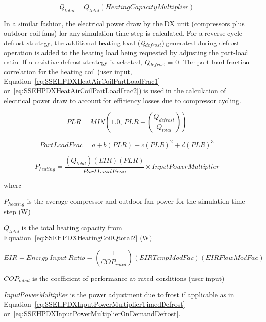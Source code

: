 \begin{equation}
Q_{total} = Q_{total}\left( {HeatingCapacityMultiplier} \right)
\label{eq:SSEHPDXHeatingCoilQtotal2}
\end{equation}

In a similar fashion, the electrical power draw by the DX unit (compressors plus outdoor coil fans) for any simulation time step is calculated. For a reverse-cycle defrost strategy, the additional heating load (\emph{Q\(_{defrost}\)}) generated during defrost operation is added to the heating load being requested by adjusting the part-load ratio. If a resistive defrost strategy is selected, \emph{Q\(_{defrost}\)} = 0. The part-load fraction correlation for the heating coil (user input, Equation~\ref{eq:SSEHPDXHeatAirCoilPartLoadFrac1} or~\ref{eq:SSEHPDXHeatAirCoilPartLoadFrac2}) is used in the calculation of electrical power draw to account for efficiency losses due to compressor cycling.

\begin{equation}
  PLR = MIN \left( 1.0,~PLR + \left( \frac{Q_{defrost}}{Q_{total}} \right) \right)
\end{equation}

\begin{equation}
PartLoadFrac = a + b\left( {PLR} \right) + c{\left( {PLR} \right)^2} + d{\left( {PLR} \right)^3}
\end{equation}

\begin{equation}
  P_{heating} = \frac{{\left( {{Q_{total}}} \right)\left( {EIR} \right)\left( {PLR} \right)}}{{PartLoadFrac}} \times InputPowerMultiplier
\end{equation}

where

\({P_{heating}}\) is the average compressor and outdoor fan power for the simulation time step (W)

\({Q_{total}}\) is the total heating capacity from Equation~\ref{eq:SSEHPDXHeatingCoilQtotal2} (W)

\begin{equation}
  EIR = Energy~Input~Ratio = \left( {\frac{1}{{CO{P_{rated}}}}} \right)\left( {EIRTempModFac} \right)\left( {EIRFlowModFac} \right)
\end{equation}

\(CO{P_{rated}}\) is the coefficient of performance at rated conditions (user input)

\emph{InputPowerMultiplier} is the power adjustment due to frost if applicable as in Equation~\ref{eq:SSEHPDXInputPowerMultiplierTimedDefrost} or~\ref{eq:SSEHPDXInputPowerMultiplierOnDemandDefrost}.

